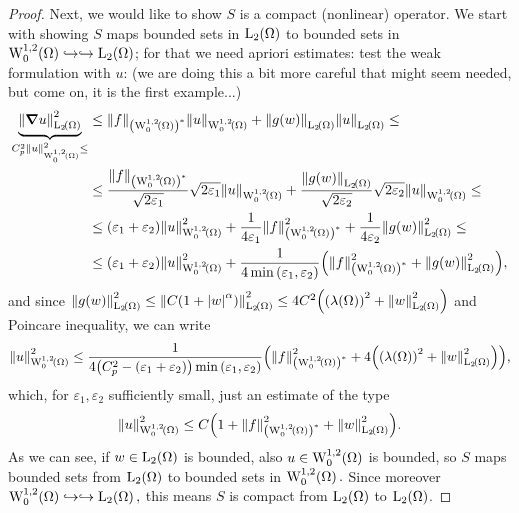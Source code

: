 \documentclass{article}
\begin{document}
\begin{example}
\begin{proof}
		Next, we would like to show $S$ is a compact (nonlinear) operator. We start with showing $S$ maps bounded sets in $\LpSet[2]{\Omega}$ to bounded sets in $\WkpzeroSet[1][2]{\Omega} \hookrightarrow \hookrightarrow \LpSet[2]{\Omega}$; for that we need apriori estimates: test the weak formulation with $u$: (we are doing this a bit more careful that might seem needed, but come on, it is the first example...)
\begin{align*}
	\underbrace{\norm{\grad u}_{\LpSet[2]{\Omega}}^{2}}_{C_p^{2} \norm{u}_{\WkpzeroSet[1][2]{\Omega}}^{2} \leq} &\leq\norm{f}_{\qty(\WkpzeroSet[1][2]{\Omega})^{*}}\norm{u}_{\WkpzeroSet[1][2]{\Omega}} + \norm{g(w)}_{\LpSet[2]{\Omega}} \norm{u}_{\LpSet[2]{\Omega}}\leq \\
														    &\leq \frac{\norm{f}_{\qty(\WkpzeroSet[1][2]{\Omega})^{*}}}{\sqrt{2 \varepsilon_1}}\sqrt{2 \varepsilon_1}\norm{u}_{\WkpzeroSet[1][2]{\Omega}} + \frac{\norm{g(w)}_{\LpSet[2]{\Omega}}}{\sqrt{2 \varepsilon_2}} \sqrt{2 \varepsilon_2}\norm{u}_{\WkpzeroSet[1][2]{\Omega}}\leq   \\
														    &\leq \qty(\varepsilon_1 + \varepsilon_2)\norm{u}_{\WkpzeroSet[1][2]{\Omega}}^{2} + \frac{1}{4 \varepsilon_1} \norm{f}_{\qty(\WkpzeroSet[1][2]{\Omega})^{*}}^{2} + \frac{1}{4 \varepsilon_2} \norm{g(w)}_{\LpSet[2]{\Omega}}^{2} \leq \\
														    &\leq \qty(\varepsilon_1 + \varepsilon_2)\norm{u}_{\WkpzeroSet[1][2]{\Omega}}^{2}+ \frac{1}{4\min\qty(\varepsilon_1, \varepsilon_2)}\qty(\norm{f}_{\qty(\WkpzeroSet[1][2]{\Omega})^{*}}^{2}+ \norm{g(w)}_{\LpSet[2]{\Omega}}^{2}),
\end{align*}
and since $\norm{g(w)}_{\LpSet[2]{\Omega}}^{2} \leq \norm{C\qty(1+\abs{w}^{\alpha})}_{\LpSet[2]{\Omega}}^{2} \leq 4C^{2}\qty(\qty(\lambda\qty(\Omega))^{2}+\norm{w}_{\LpSet[2]{\Omega}}^{2}) $ and Poincare inequality, we can write
\[
	\norm{u}_{\WkpzeroSet[1][2]{\Omega}}^{2} \leq \frac{1}{4\qty(C_p^{2} - \qty(\varepsilon_1 + \varepsilon_2))\min\qty(\varepsilon_1, \varepsilon_2)}\qty(\norm{f}_{\qty(\WkpzeroSet[1][2]{\Omega})^{*}}^{2}+ 4\qty(\qty(\lambda\qty(\Omega))^{2}+\norm{w}_{\LpSet[2]{\Omega}}^{2})),
\]
which, for $\varepsilon_1, \varepsilon_2$ sufficiently small, just an estimate of the type
\[
	\norm{u}_{\WkpzeroSet[1][2]{\Omega}}^{2} \leq C\qty(1+\norm{f}_{\qty(\WkpzeroSet[1][2]{\Omega})^{*}}^{2} + \norm{w}_{\LpSet[2]{\Omega}}^{2}).
\]
As we can see, if $w \in \LpSet[2]{\Omega}$ is bounded, also $u \in \WkpzeroSet[1][2]{\Omega}$ is bounded, so $S$ maps bounded sets from $\LpSet[2]{\Omega}$ to bounded sets in $\WkpzeroSet[1][2]{\Omega}.$ Since moreover $\WkpzeroSet[1][2]{\Omega} \hookrightarrow \hookrightarrow \LpSet[2]{\Omega}, $ this means $S$ is compact from $\LpSet[2]{\Omega}$ to $\LpSet[2]{\Omega}$.


\end{proof}
\end{example}
\end{document}
